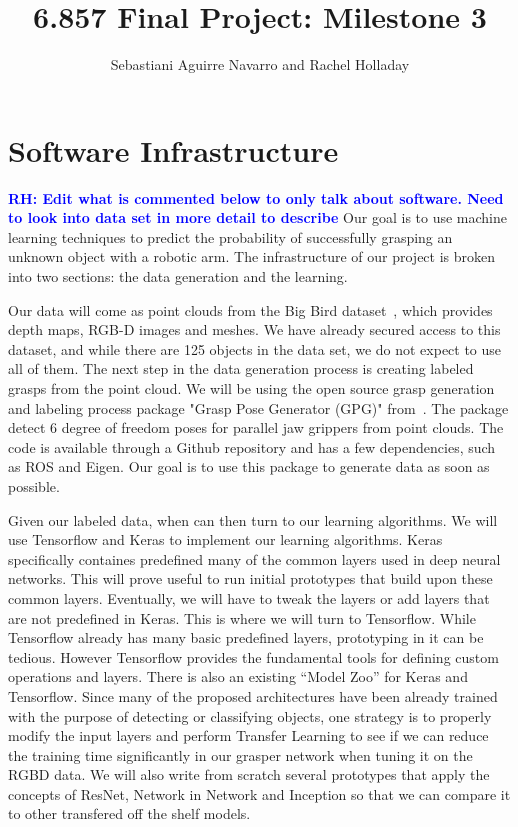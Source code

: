 \documentclass[letterpaper, 10 pt]{article}
\newcommand{\rhnote}[1]{\ifthenelse{\boolean{include-notes}}%
 {\textcolor{blue}{\textbf{RH: #1}}}{}}
\begin{document}
\title{6.857 Final Project: Milestone 3}
\author{Sebastiani Aguirre Navarro and Rachel Holladay}
\maketitle

\section{Software Infrastructure}

\rhnote{Edit what is commented below to only talk about software. Need to look into data set in more detail to describe}
Our goal is to use machine learning techniques to predict the probability of successfully grasping an unknown object with a robotic arm. 
The infrastructure of our project is broken into two sections: the data generation and the learning. 

Our data will come as point clouds from the Big Bird dataset~\cite{singh2014bigbird}, which provides depth maps, RGB-D images and meshes.
We have already secured access to this dataset, and while there are 125 objects in the data set, we do not expect to use all of them. 
The next step in the data generation process is creating labeled grasps from the point cloud. 
We will be using the open source grasp generation and labeling process package "Grasp Pose Generator (GPG)" from~\cite{pas2017grasp}. 
The package detect 6 degree of freedom poses for parallel jaw grippers from point clouds. 
The code is available through a Github repository and has a few dependencies, such as ROS and Eigen.
Our goal is to use this package to generate data as soon as possible. 

Given our labeled data, when can then turn to our learning algorithms. 
We will use Tensorflow and Keras to implement our learning algorithms. Keras specifically containes predefined many of the common layers used in deep neural networks.
This will prove useful to run initial prototypes that build upon these common layers. Eventually, we will have to tweak the layers or add layers that are not predefined in Keras.
This is where we will turn to Tensorflow. While Tensorflow already has many basic predefined layers, prototyping in it can be tedious. However Tensorflow provides the fundamental tools for defining custom operations and layers.
There is also an existing ``Model Zoo'' for Keras and Tensorflow. Since many of the proposed architectures have been already trained with the purpose of detecting or classifying objects, one strategy is to properly modify the input layers and
perform Transfer Learning to see if we can reduce the training time significantly in our grasper network when tuning it on the RGBD data. We will also write from scratch several prototypes that apply the concepts of ResNet, Network in Network
and Inception so that we can compare it to other transfered off the shelf models. 
\end{document}
